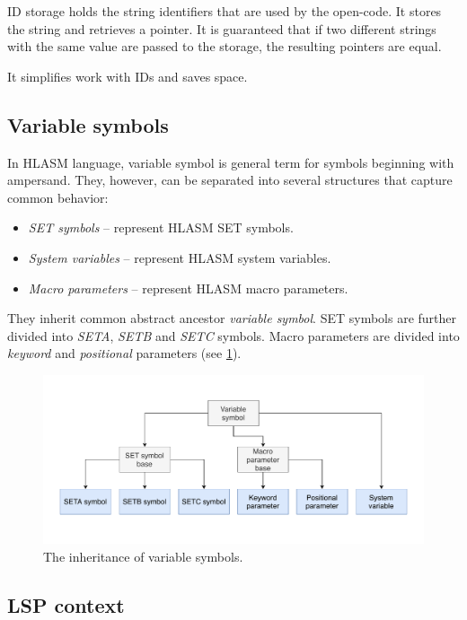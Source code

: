 ID storage holds the string identifiers that are used by the open-code. 
It stores the string and retrieves a pointer. It is guaranteed that if two different strings with the same value are passed to the storage, the resulting pointers are equal.

It simplifies work with IDs and saves space. 

\subsection{Variable symbols}
\label{lab06:var_sym}

In HLASM language, variable symbol is general term for symbols beginning with ampersand. They, however, can be separated into several structures that capture common behavior:

\begin{itemize}
	\item \emph{SET symbols} -- represent HLASM SET symbols.
	\item \emph{System variables} -- represent HLASM system variables.
	\item \emph{Macro parameters} -- represent HLASM macro parameters.
\end{itemize}

They inherit common abstract ancestor \emph{variable symbol}. SET symbols are further divided into \emph{SETA}, \emph{SETB} and \emph{SETC} symbols. Macro parameters are divided into \emph{keyword} and \emph{positional} parameters (see \cref{fig06:var}).

\begin{figure}
	\centering
	\includegraphics[width=\textwidth]{img/variable_arch}
	\caption{The inheritance of variable symbols.}
	\label{fig06:var}
\end{figure}

\subsection{LSP context}

